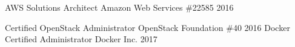 

\begin{cvhonors}

  \cvhonor
    {AWS Solutions Architect}
    {Amazon Web Services}
    {\#22585}
    {2016} %

  \cvhonor
    {Certified OpenStack Administrator}
    {OpenStack Foundation}
    {\#40}
    {2016} %
  \cvhonor
    {Docker Certified Administrator}
    {Docker Inc.}
    {}
    {2017} %

\end{cvhonors}
